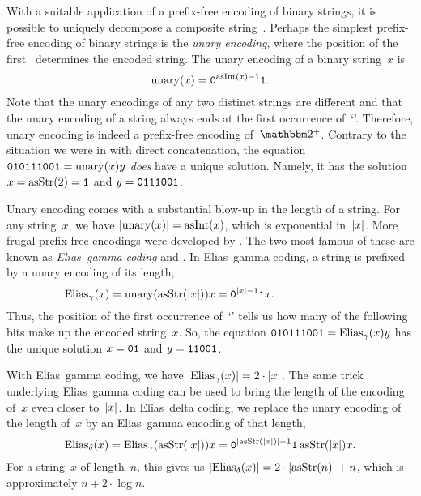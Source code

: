 With a suitable application of a prefix-free encoding of binary strings, it is possible to uniquely decompose a composite string~\parencite{cover2006elements}.
Perhaps the simplest prefix-free encoding of binary strings is the \emph{unary encoding}, where the position of the first~ determines the encoded string.
The unary encoding of a binary string~$x$ is
\begin{equation*}
  \operatorname{unary}(x) = \textnormal{\texttt{0}}^{\operatorname{asInt}(x) - 1} \textnormal{\texttt{1}}.
\end{equation*}
Note that the unary encodings of any two distinct strings are different and that the unary encoding of a string always ends at the first occurrence of~`'.
Therefore, unary encoding is indeed a prefix-free encoding of~$\binary^+$.
Contrary to the situation we were in with direct concatenation, the equation $\textnormal{\texttt{010111001}} = \operatorname{unary}(x)y$ \emph{does} have a unique solution.
Namely, it has the solution $x = \operatorname{asStr}(2) = \textnormal{\texttt{1}}$ and $y = \textnormal{\texttt{0111001}}$.

Unary encoding comes with a substantial blow-up in the length of a string.
For any string~$x$, we have ${\lvert\operatorname{unary}(x)\rvert} = \operatorname{asInt}(x)$, which is exponential in~${\lvert x\rvert}$.
More frugal prefix-free encodings were developed by \textcite{elias1975universal}.
The two most famous of these are known as \emph{Elias~gamma coding} and  \parencite[see also][]{sayood2017introduction}.
In Elias~gamma coding, a string is prefixed by a unary encoding of its length,
\begin{equation*}
  \mathrlap{
    \Elias_\gamma(x) \deq \unary(\asStr(\length{x})) x = \bits{0}^{\length{x} - 1} \bits{1} x.
  }\hphantom{
    \Elias_\delta(x) \deq \Elias_\gamma(\asStr(\length{x})) x = \bits{0}^{\length{\asStr(\length{x})} - 1} \bits{1} \asStr(\length{x}) x.
  }
\end{equation*}
Thus, the position of the first occurrence of~`' tells us how many of the following bits make up the encoded string~$x$.
So, the equation $\textnormal{\texttt{010111001}} = \operatorname{Elias}_\gamma(x)y$ has the unique solution $x = \textnormal{\texttt{01}}$ and $y = \textnormal{\texttt{11001}}$.

With Elias~gamma coding, we have ${\lvert\operatorname{Elias}_\gamma(x)\rvert} = 2 \cdot {\lvert x\rvert}$.
The same trick underlying Elias~gamma coding can be used to bring the length of the encoding of~$x$ even closer to~${\lvert x\rvert}$.
In Elias~delta coding, we replace the unary encoding of the length of~$x$ by an Elias~gamma encoding of that length,
\begin{equation*}
  \operatorname{Elias}_\delta(x) = \operatorname{Elias}_\gamma(\operatorname{asStr}({\lvert x\rvert})) x = \textnormal{\texttt{0}}^{{\lvert\operatorname{asStr}({\lvert x\rvert})\rvert} - 1} \textnormal{\texttt{1}} \operatorname{asStr}({\lvert x\rvert}) x.
\end{equation*}
For a string~$x$ of length~$n$, this gives us ${\lvert\operatorname{Elias}_\delta(x)\rvert} = 2 \cdot {\lvert\operatorname{asStr}(n)\rvert} + n$, which is approximately $n + 2 \cdot \log n$.

